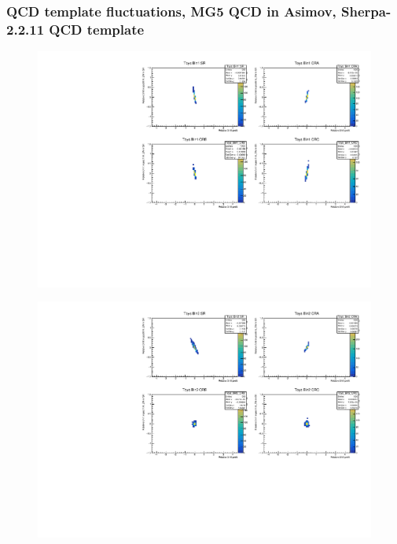 \subsubsection{\mjj QCD template fluctuations, MG5 QCD in Asimov, Sherpa-2.2.11 QCD template}
\begin{figure}[H]
\includegraphics[width=\textwidth]{plots/diffx/instab/linearfx/instabilities_mjj_QCD_Sh2211_Signal_Sh2211_BSMCQCDSTATS_linearfx_newbinning_madgraphasimov_bin1.pdf}
\end{figure}
\begin{figure}[H]
\includegraphics[width=\textwidth]{plots/diffx/instab/linearfx/instabilities_mjj_QCD_Sh2211_Signal_Sh2211_BSMCQCDSTATS_linearfx_newbinning_madgraphasimov_bin2.pdf}
\end{figure}
